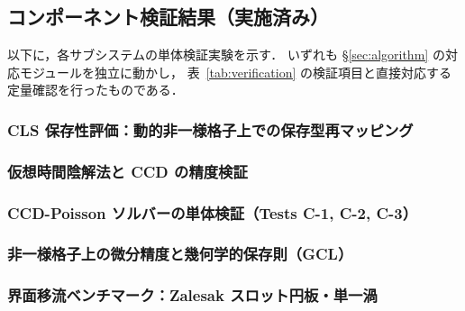 %

\subsection{コンポーネント検証結果（実施済み）}
\label{sec:component_verification}

以下に，各サブシステムの単体検証実験を示す．
いずれも §\ref{sec:algorithm} の対応モジュールを独立に動かし，
表~\ref{tab:verification} の検証項目と直接対応する定量確認を行ったものである．

\subsubsection{CLS 保存性評価：動的非一様格子上での保存型再マッピング}
\label{app:cls_conservation}


\subsubsection{仮想時間陰解法と CCD の精度検証}
\label{app:ccd_pseudotime}


\subsubsection{CCD-Poisson ソルバーの単体検証（Tests C-1, C-2, C-3）}
\label{sec:ccd_poisson_verification}


\subsubsection{非一様格子上の微分精度と幾何学的保存則（GCL）}
\label{sec:gcl_verification}


\subsubsection{界面移流ベンチマーク：Zalesak スロット円板・単一渦}
\label{sec:interface_advection_bench}

